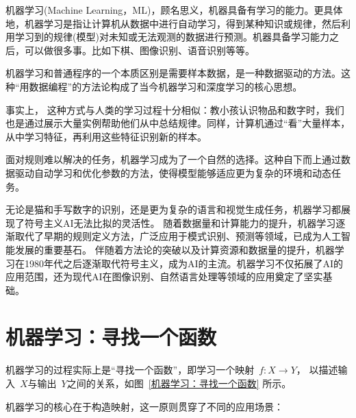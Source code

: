 机器学习(Machine Learning，ML)，顾名思义，机器具备有学习的能力。更具体地，机器学习是指让计算机从数据中进行自动学习，得到某种知识或规律，然后利用学习到的规律(模型)对未知或无法观测的数据进行预测。机器具备学习能力之后，可以做很多事。比如下棋、图像识别、语音识别等等。

机器学习和普通程序的一个本质区别是需要样本数据，是一种数据驱动的方法。这种“用数据编程”的方法论构成了当今机器学习和深度学习的核心思想。

事实上， 这种方式与人类的学习过程十分相似：教小孩认识物品和数字时，我们也是通过展示大量实例帮助他们从中总结规律。同样，计算机通过“看”大量样本，从中学习特征，再利用这些特征识别新的样本。

面对规则难以解决的任务，机器学习成为了一个自然的选择。这种自下而上通过数据驱动自动学习和优化参数的方法，使得模型能够适应更为复杂的环境和动态任务。

无论是猫和手写数字的识别，还是更为复杂的语言和视觉生成任务，机器学习都展现了符号主义AI无法比拟的灵活性。
随着数据量和计算能力的提升，机器学习逐渐取代了早期的规则定义方法，广泛应用于模式识别、预测等领域，已成为人工智能发展的重要基石。
伴随着方法论的突破以及计算资源和数据量的提升，机器学习在1980年代之后逐渐取代符号主义，成为AI的主流。机器学习不仅拓展了AI的应用范围，还为现代AI在图像识别、自然语言处理等领域的应用奠定了坚实基础。


\section{机器学习：寻找一个函数}\label{sec:机器学习}
机器学习的过程实际上是“寻找一个函数”，即学习一个映射~$f: X \rightarrow Y$， 以描述输入~$X$与输出~$Y$之间的关系，如图~\ref{机器学习：寻找一个函数} 所示。

机器学习的核心在于构造映射，这一原则贯穿了不同的应用场景：

